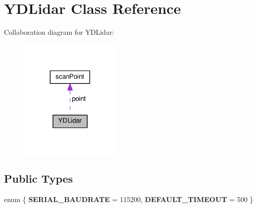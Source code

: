 \hypertarget{class_y_d_lidar}{}\section{Y\+D\+Lidar Class Reference}
\label{class_y_d_lidar}


Collaboration diagram for Y\+D\+Lidar\+:\nopagebreak
\begin{figure}[H]
\begin{center}
\leavevmode
\includegraphics[width=140pt]{class_y_d_lidar__coll__graph}
\end{center}
\end{figure}
\subsection*{Public Types}
\begin{DoxyCompactItemize}
\item 
enum \{ {\bfseries S\+E\+R\+I\+A\+L\+\_\+\+B\+A\+U\+D\+R\+A\+TE} = 115200, 
{\bfseries D\+E\+F\+A\+U\+L\+T\+\_\+\+T\+I\+M\+E\+O\+UT} = 500
 \}\hypertarget{class_y_d_lidar_a93fcca770d136acd68615c077fb98fac}{}\label{class_y_d_lidar_a93fcca770d136acd68615c077fb98fac}

\end{DoxyCompactItemize}
